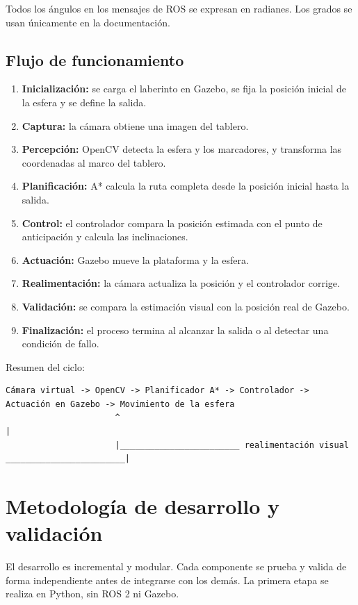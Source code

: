 \documentclass[11pt,a4paper]{article}
\begin{document}
Todos los ángulos en los mensajes de ROS se expresan en radianes. Los grados se usan únicamente en la documentación.

\subsection{Flujo de funcionamiento}
\begin{enumerate}
    \item \textbf{Inicialización:} se carga el laberinto en Gazebo, se fija la posición inicial de la esfera y se define la salida.
    \item \textbf{Captura:} la cámara obtiene una imagen del tablero.
    \item \textbf{Percepción:} OpenCV detecta la esfera y los marcadores, y transforma las coordenadas al marco del tablero.
    \item \textbf{Planificación:} A* calcula la ruta completa desde la posición inicial hasta la salida.
    \item \textbf{Control:} el controlador compara la posición estimada con el punto de anticipación y calcula las inclinaciones.
    \item \textbf{Actuación:} Gazebo mueve la plataforma y la esfera.
    \item \textbf{Realimentación:} la cámara actualiza la posición y el controlador corrige.
    \item \textbf{Validación:} se compara la estimación visual con la posición real de Gazebo.
    \item \textbf{Finalización:} el proceso termina al alcanzar la salida o al detectar una condición de fallo.
\end{enumerate}

Resumen del ciclo:
\begin{lstlisting}[caption={Flujo general del sistema.}]
Cámara virtual -> OpenCV -> Planificador A* -> Controlador -> Actuación en Gazebo -> Movimiento de la esfera
                      ^                                                                        |
                      |________________________ realimentación visual ________________________|
\end{lstlisting}

\section{Metodología de desarrollo y validación}
El desarrollo es incremental y modular. Cada componente se prueba y valida de forma independiente antes de integrarse con los demás. La primera etapa se realiza en Python, sin ROS 2 ni Gazebo.
\end{document}
